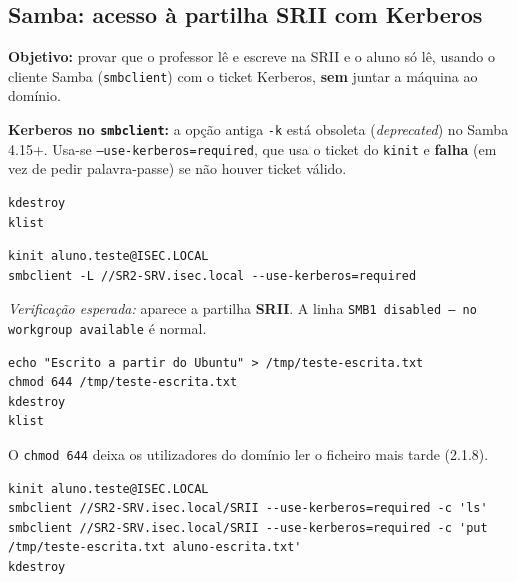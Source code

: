 
\subsection[Samba: acesso à partilha SRII com Kerberos]{Samba: acesso à partilha SRII com Kerberos}


\textbf{Objetivo:} provar que o professor lê e escreve na SRII e o aluno só lê, usando o cliente Samba (\texttt{smbclient}) com o ticket Kerberos, \textbf{sem} juntar a máquina ao domínio.

\begin{importantebox}[title={Importante}]
\textbf{Kerberos no \texttt{smbclient}:} a opção antiga \texttt{-k} está obsoleta (\emph{deprecated}) no Samba 4.15+. Usa-se \texttt{--use-kerberos=required}, que usa o ticket do \texttt{kinit} e \textbf{falha} (em vez de pedir palavra-passe) se não houver ticket válido.
\end{importantebox}


\begin{lstlisting}[style=bashstyle]
kdestroy
klist
\end{lstlisting}


\begin{lstlisting}[style=bashstyle]
kinit aluno.teste@ISEC.LOCAL
smbclient -L //SR2-SRV.isec.local --use-kerberos=required
\end{lstlisting}

\emph{Verificação esperada:} aparece a partilha \textbf{SRII}. A linha \texttt{SMB1 disabled -- no workgroup available} é normal.


\begin{lstlisting}[style=bashstyle]
echo "Escrito a partir do Ubuntu" > /tmp/teste-escrita.txt
chmod 644 /tmp/teste-escrita.txt
kdestroy
klist
\end{lstlisting}

O \texttt{chmod 644} deixa os utilizadores do domínio ler o ficheiro mais tarde (2.1.8).


\begin{lstlisting}[style=bashstyle]
kinit aluno.teste@ISEC.LOCAL
smbclient //SR2-SRV.isec.local/SRII --use-kerberos=required -c 'ls'
smbclient //SR2-SRV.isec.local/SRII --use-kerberos=required -c 'put /tmp/teste-escrita.txt aluno-escrita.txt'
kdestroy
\end{lstlisting}


